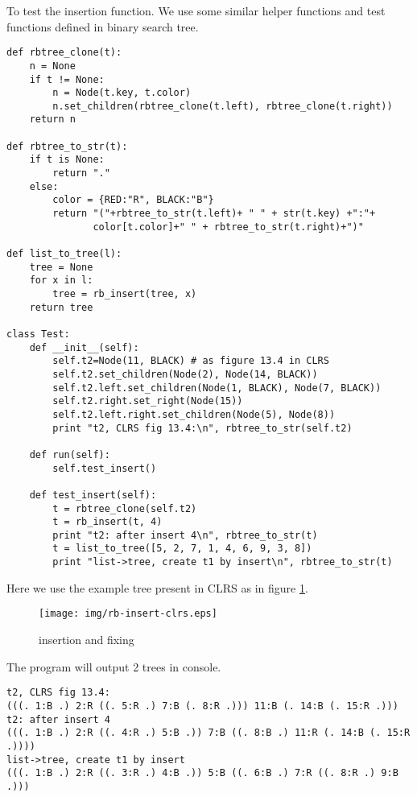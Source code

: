 \documentclass{article}
\begin{document}
To test the insertion function. We use some similar helper functions and test functions defined in binary search tree\cite{bst-lxy}.

\begin{lstlisting}
def rbtree_clone(t):
    n = None
    if t != None:
        n = Node(t.key, t.color)
        n.set_children(rbtree_clone(t.left), rbtree_clone(t.right))
    return n

def rbtree_to_str(t):
    if t is None:
        return "."
    else:
        color = {RED:"R", BLACK:"B"}
        return "("+rbtree_to_str(t.left)+ " " + str(t.key) +":"+
               color[t.color]+" " + rbtree_to_str(t.right)+")"

def list_to_tree(l):
    tree = None
    for x in l:
        tree = rb_insert(tree, x)
    return tree

class Test:
    def __init__(self):
        self.t2=Node(11, BLACK) # as figure 13.4 in CLRS
        self.t2.set_children(Node(2), Node(14, BLACK))
        self.t2.left.set_children(Node(1, BLACK), Node(7, BLACK))
        self.t2.right.set_right(Node(15))
        self.t2.left.right.set_children(Node(5), Node(8))
        print "t2, CLRS fig 13.4:\n", rbtree_to_str(self.t2)

    def run(self):
        self.test_insert()

    def test_insert(self):
        t = rbtree_clone(self.t2)
        t = rb_insert(t, 4)
        print "t2: after insert 4\n", rbtree_to_str(t)
        t = list_to_tree([5, 2, 7, 1, 4, 6, 9, 3, 8])
        print "list->tree, create t1 by insert\n", rbtree_to_str(t)
\end{lstlisting}

Here we use the example tree present in CLRS as in figure \ref{fig:rb-insert-clrs}.

\begin{figure}[htbp]
       \begin{center}
	\texttt{[image: img/rb-insert-clrs.eps]}
        \caption{insertion and fixing} \label{fig:rb-insert-clrs}
       \end{center}
\end{figure}

The program will output 2 trees in console.

\begin{verbatim}
t2, CLRS fig 13.4:
(((. 1:B .) 2:R ((. 5:R .) 7:B (. 8:R .))) 11:B (. 14:B (. 15:R .)))
t2: after insert 4
(((. 1:B .) 2:R ((. 4:R .) 5:B .)) 7:B ((. 8:B .) 11:R (. 14:B (. 15:R .))))
list->tree, create t1 by insert
(((. 1:B .) 2:R ((. 3:R .) 4:B .)) 5:B ((. 6:B .) 7:R ((. 8:R .) 9:B .)))
\end{verbatim}
\end{document}
